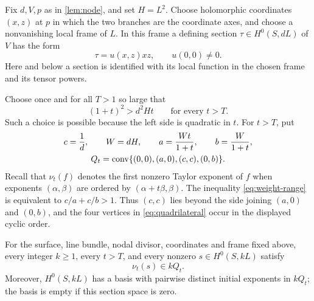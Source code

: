 Fix $d,V,p$ as in \cref{lem:node}, and set $H=L^2$. Choose holomorphic coordinates $(x,z)$ at $p$ in which the two branches are the coordinate axes, and choose a nonvanishing local frame of $L$. In this frame a defining section $\tau\in H^0(S,dL)$ of $V$ has the form
\begin{equation}
 \tau=u(x,z)xz,\qquad u(0,0)\ne0.
 \label{eq:node-unit}
\end{equation}
Here and below a section is identified with its local function in the chosen frame and its tensor powers.

Choose once and for all $T>1$ so large that
\begin{equation}
 (1+t)^2>d^2Ht\qquad\text{for every }t>T.
 \label{eq:weight-range}
\end{equation}
Such a choice is possible because the left side is quadratic in $t$. For $t>T$, put
\begin{equation}
 \begin{gathered}
 c=\frac1d,\qquad W=dH,\qquad
 a=\frac{Wt}{1+t},\qquad b=\frac{W}{1+t},\\
 Q_t=\operatorname{conv}\{(0,0),(a,0),(c,c),(0,b)\}.
 \end{gathered}
 \label{eq:quadrilateral}
\end{equation}
Recall that $\nu_t(f)$ denotes the first nonzero Taylor exponent of $f$ when exponents $(\alpha,\beta)$ are ordered by $(\alpha+t\beta,\beta)$.  The inequality \eqref{eq:weight-range} is equivalent to $c/a+c/b>1$.  Thus $(c,c)$ lies beyond the side joining $(a,0)$ and $(0,b)$, and the four vertices in \eqref{eq:quadrilateral} occur in the displayed cyclic order.

\begin{proposition}
\label{prop:quadrilateral}
For the surface, line bundle, nodal divisor, coordinates and frame fixed above, every integer $k\ge1$, every $t>T$, and every nonzero $s\in H^0(S,kL)$ satisfy
\[
 \nu_t(s)\in kQ_t.
\]
Moreover, $H^0(S,kL)$ has a basis with pairwise distinct initial exponents in $kQ_t$; the basis is empty if this section space is zero.
\end{proposition}

